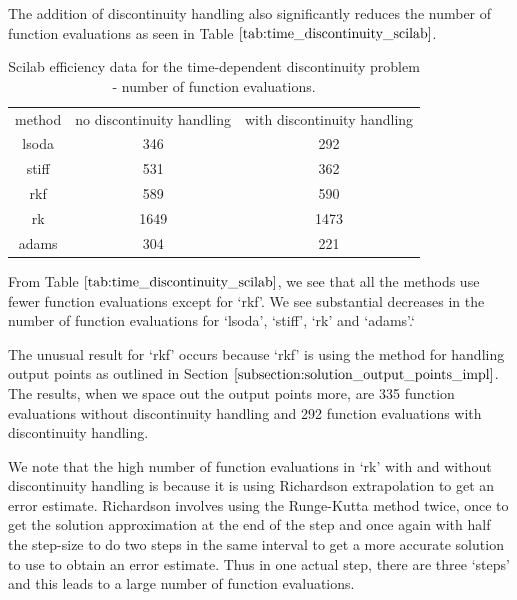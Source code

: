 The addition of discontinuity handling also significantly reduces the number of function evaluations as seen in Table $\ref{tab:time_discontinuity_scilab}$.

\begin{table}[H]
\caption {Scilab efficiency data for the time-dependent discontinuity problem - number of function evaluations.} 
\label{tab:time_discontinuity_scilab} 
\begin{center}
\begin{tabular}{ c c c }
method & no discontinuity handling & with discontinuity handling \\ 
lsoda & 346 & 292 \\
stiff & 531 & 362 \\
rkf & 589 & 590 \\
rk & 1649 & 1473 \\
adams & 304 & 221 \\
\end{tabular}
\end{center}
\end{table}

From Table $\ref{tab:time_discontinuity_scilab}$, we see that all the methods use fewer function evaluations except for `rkf'. We see substantial decreases in the number of function evaluations for `lsoda', `stiff', `rk' and `adams'.`

The unusual result for `rkf' occurs because `rkf' is using the method for handling output points as outlined in Section $\ref{subsection:solution_output_points_impl}$. The results, when we space out the output points more, are 335 function evaluations without discontinuity handling and 292 function evaluations with discontinuity handling.

We note that the high number of function evaluations in `rk' with and without discontinuity handling is because it is using Richardson extrapolation to get an error estimate. Richardson involves using the Runge-Kutta method twice, once to get the solution approximation at the end of the step and once again with half the step-size to do two steps in the same interval to get a more accurate solution to use to obtain an error estimate. Thus in one actual step, there are three `steps' and this leads to a large number of function evaluations.

